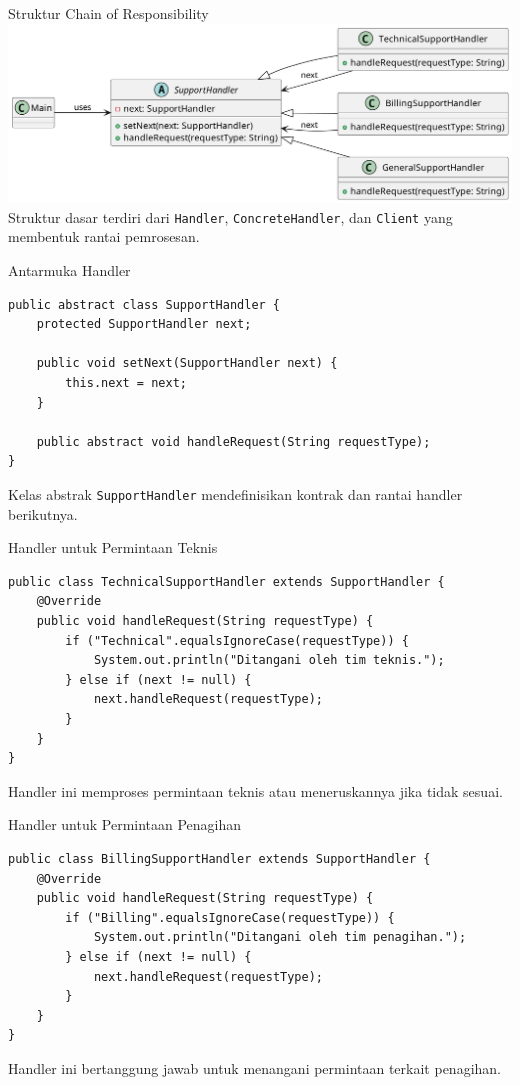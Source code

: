 \documentclass[aspectratio=169, table]{beamer}
\begin{document}
\begin{frame}{Struktur Chain of Responsibility}
\centering
\includegraphics[width=\textwidth]{../../figures/out/chain_of_responsibility.png}
\vspace{4pt}
\small Struktur dasar terdiri dari \texttt{Handler}, \texttt{ConcreteHandler}, dan \texttt{Client} yang membentuk rantai pemrosesan.
\end{frame}

\begin{frame}[fragile]{Antarmuka Handler}
\begin{lstlisting}[style=JavaStyle]
public abstract class SupportHandler {
	protected SupportHandler next;
	
	public void setNext(SupportHandler next) {
		this.next = next;
	}
	
	public abstract void handleRequest(String requestType);
}
\end{lstlisting}
\small Kelas abstrak \texttt{SupportHandler} mendefinisikan kontrak dan rantai handler berikutnya.
\end{frame}

\begin{frame}[fragile]{Handler untuk Permintaan Teknis}
\begin{lstlisting}[style=JavaStyle]
public class TechnicalSupportHandler extends SupportHandler {
	@Override
	public void handleRequest(String requestType) {
		if ("Technical".equalsIgnoreCase(requestType)) {
			System.out.println("Ditangani oleh tim teknis.");
		} else if (next != null) {
			next.handleRequest(requestType);
		}
	}
}
\end{lstlisting}
\small Handler ini memproses permintaan teknis atau meneruskannya jika tidak sesuai.
\end{frame}

\begin{frame}[fragile]{Handler untuk Permintaan Penagihan}
\begin{lstlisting}[style=JavaStyle]
public class BillingSupportHandler extends SupportHandler {
	@Override
	public void handleRequest(String requestType) {
		if ("Billing".equalsIgnoreCase(requestType)) {
			System.out.println("Ditangani oleh tim penagihan.");
		} else if (next != null) {
			next.handleRequest(requestType);
		}
	}
}
\end{lstlisting}
\small Handler ini bertanggung jawab untuk menangani permintaan terkait penagihan.
\end{frame}
\end{document}
